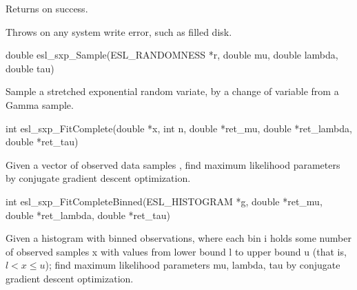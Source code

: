 \begin{sreapi}
Returns  on success.

Throws  on any system write error, such as filled disk.


\hypertarget{func:esl_sxp_Sample()}
{\item[double esl\_sxp\_Sample(ESL\_RANDOMNESS *r, double mu, double lambda, double tau)]}

Sample a stretched exponential random variate,
by a change of variable from a Gamma sample.


\hypertarget{func:esl_sxp_FitComplete()}
{\item[int esl\_sxp\_FitComplete(double *x, int n,
		    double *ret\_mu, double *ret\_lambda, double *ret\_tau)]}

Given a vector of  observed data samples ,
find maximum likelihood parameters by conjugate gradient 
descent optimization.


\hypertarget{func:esl_sxp_FitCompleteBinned()}
{\item[int esl\_sxp\_FitCompleteBinned(ESL\_HISTOGRAM *g,
			  double *ret\_mu, double *ret\_lambda, double *ret\_tau)]}

Given a histogram  with binned observations, where each
bin i holds some number of observed samples x with values from 
lower bound l to upper bound u (that is, $l < x \leq u$);
find maximum likelihood parameters mu, lambda, tau by conjugate
gradient descent optimization.


\end{sreapi}

